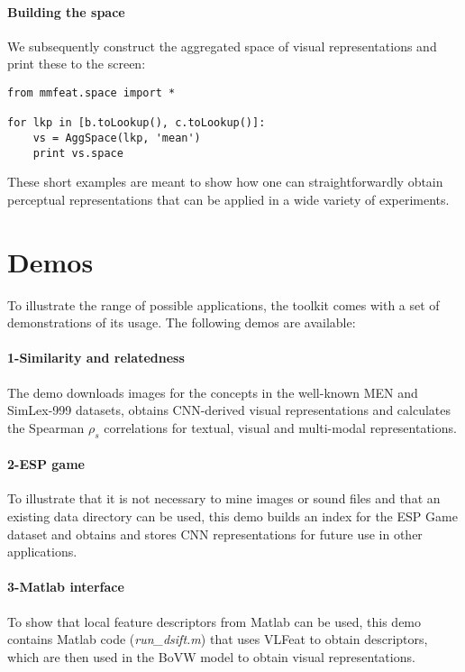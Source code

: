 \documentclass[11pt]{article}
\begin{document}
\paragraph{Building the space} We subsequently construct the aggregated space of visual representations and print these to the screen:

\begin{small}
\begin{verbatim}
from mmfeat.space import *

for lkp in [b.toLookup(), c.toLookup()]:
    vs = AggSpace(lkp, 'mean')
    print vs.space
\end{verbatim}
\end{small}

\noindent These short examples are meant to show how one can straightforwardly obtain perceptual representations that can be applied in a wide variety of experiments.

\section{Demos}

To illustrate the range of possible applications, the toolkit comes with a set of demonstrations of its usage. The following demos are available:

\paragraph{1-Similarity and relatedness} The demo downloads images for the concepts in the well-known MEN \cite{Bruni:2012acl} and SimLex-999 \cite{Hill:2014arxiv} datasets, obtains CNN-derived visual representations and calculates the Spearman $\rho_s$ correlations for textual, visual and multi-modal representations.

\paragraph{2-ESP game} To illustrate that it is not necessary to mine images or sound files and that an existing data directory can be used, this demo builds an index for the ESP Game dataset \cite{von2004labeling} and obtains and stores CNN representations for future use in other applications.

\paragraph{3-Matlab interface} To show that local feature descriptors from Matlab can be used, this demo contains Matlab code (\emph{run\_dsift.m}) that uses VLFeat to obtain descriptors, which are then used in the BoVW model to obtain visual representations.
\end{document}
